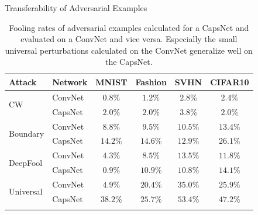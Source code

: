 \documentclass[final]{beamer}
\newlength{\onecolwid}
\newlength{\twocolwid}
\begin{document}
\begin{frame}[t]
\begin{columns}[t]
\begin{column}{\twocolwid}
\begin{columns}[t,totalwidth=\twocolwid]
\begin{column}{\onecolwid}
\begin{block}{Transferability of Adversarial Examples}
						\begin{table}
							\centering\small{
								\begin{tabular}{llcccc}
									\toprule
									Attack & Network       & MNIST & Fashion & SVHN & CIFAR10  \\
									\midrule
									\multirow{2}{*}{CW} & ConvNet & $0.8\%$ & $1.2\%$ & $2.8\%$ & $2.4\%$ \\
									& CapsNet            & $2.0\%$ & $2.0\%$ & $3.8\%$ & $2.0\%$ \\
									\midrule
									\multirow{2}{*}{Boundary} & ConvNet & $8.8\%$ & $9.5\%$ & $10.5\%$ & $13.4\%$ \\
									& CapsNet            & $14.2\%$ & $14.6\%$ & $12.9\%$ & $26.1\%$ \\
									\midrule
									\multirow{2}{*}{DeepFool} & ConvNet & $4.3\%$ & $8.5\%$ & $13.5\%$ & $11.8\%$ \\
									& CapsNet           & $0.9\%$ & $10.9\%$ & $10.8\%$ & $14.1\%$ \\
									\midrule
									\multirow{2}{*}{Universal} & ConvNet & $4.9\%$ & $20.4\%$ & $35.0\%$ & $25.9\%$ \\
									& CapsNet           & $38.2\%$ & $25.7\%$ & $53.4\%$ & $47.2\%$ \\
									\bottomrule\\
							\end{tabular}}
							\caption{\phantom{T}Fooling rates of adversarial examples calculated for a CapsNet and evaluated on a ConvNet and vice versa. Especially the small universal perturbations calculated on the ConvNet generalize well on the CapsNet.}
							\label{tab:attacks}
						\end{table}
						
						
						
						
					\end{block}
					

\end{column}
\end{columns}
\end{column}
\end{columns}
\end{frame}
\end{document}
